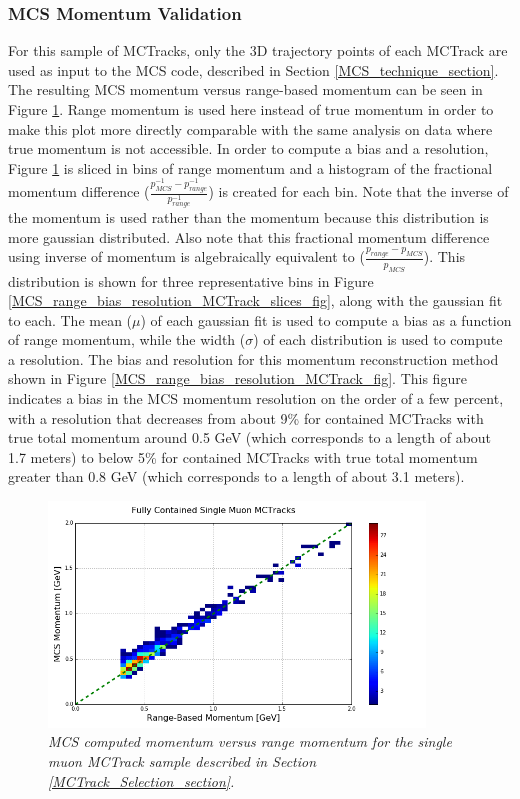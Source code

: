 \subsubsection{MCS Momentum Validation}\label{MCS_Momentum_Validation_MCTrack_section}
For this sample of {\sc MCTracks}, only the 3D trajectory points of each {\sc MCTrack} are used as input to the MCS code, described in Section \ref{MCS_technique_section}. The resulting MCS momentum versus range-based momentum can be seen in Figure \ref{MCS_range_momentum_MCTrack_fig}. Range momentum is used here instead of true momentum in order to make this plot more directly comparable with the same analysis on data where true momentum is not accessible. In order to compute a bias and a resolution, Figure \ref{MCS_range_momentum_MCTrack_fig} is sliced in bins of range momentum and a histogram of the fractional momentum difference ($\frac{p_{MCS}^{-1} - p_{range}^{-1}}{p_{range}^{-1}}$) is created for each bin. Note that the inverse of the momentum is used rather than the momentum because this distribution is more gaussian distributed. Also note that this fractional momentum difference using inverse of momentum is algebraically equivalent to ($\frac{p_{range} - p_{MCS}}{p_{MCS}}$). This distribution is shown for three representative bins in Figure \ref{MCS_range_bias_resolution_MCTrack_slices_fig}, along with the gaussian fit to each.  The mean ($\mu$) of each gaussian fit is used to compute a bias as a function of range momentum, while the width ($\sigma$) of each distribution is used to compute a resolution. The bias and resolution for this momentum reconstruction method shown in Figure \ref{MCS_range_bias_resolution_MCTrack_fig}. This figure indicates a bias in the MCS momentum resolution on the order of a few percent, with a resolution that decreases from about 9\% for contained {\sc MCTracks} with true total momentum around 0.5 GeV (which corresponds to a length of about 1.7 meters) to below 5\% for contained {\sc MCTracks} with true total momentum greater than 0.8 GeV (which corresponds to a length of about 3.1 meters).


\begin{figure}[ht!]
\begin{center}
\includegraphics[width=100mm]{Figures/MCS_range_comparison_SingleMuonMCTrack.png}
\end{center}
\caption{\textit{MCS computed momentum versus range momentum for the single muon {\sc MCTrack} sample described in Section \ref{MCTrack_Selection_section}.}}
\label{MCS_range_momentum_MCTrack_fig}
\end{figure}

